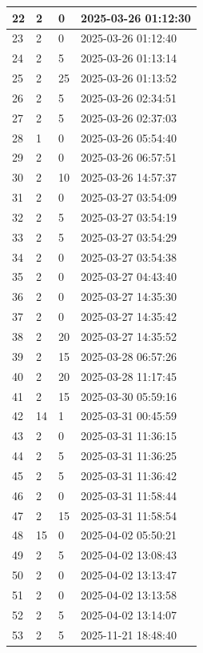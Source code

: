 \begin{longtable}{|l|l|l|l|}
22 & 2 & 0 & 2025-03-26 01:12:30 \\ \hline 
23 & 2 & 0 & 2025-03-26 01:12:40 \\ \hline 
24 & 2 & 5 & 2025-03-26 01:13:14 \\ \hline 
25 & 2 & 25 & 2025-03-26 01:13:52 \\ \hline 
26 & 2 & 5 & 2025-03-26 02:34:51 \\ \hline 
27 & 2 & 5 & 2025-03-26 02:37:03 \\ \hline 
28 & 1 & 0 & 2025-03-26 05:54:40 \\ \hline 
29 & 2 & 0 & 2025-03-26 06:57:51 \\ \hline 
30 & 2 & 10 & 2025-03-26 14:57:37 \\ \hline 
31 & 2 & 0 & 2025-03-27 03:54:09 \\ \hline 
32 & 2 & 5 & 2025-03-27 03:54:19 \\ \hline 
33 & 2 & 5 & 2025-03-27 03:54:29 \\ \hline 
34 & 2 & 0 & 2025-03-27 03:54:38 \\ \hline 
35 & 2 & 0 & 2025-03-27 04:43:40 \\ \hline 
36 & 2 & 0 & 2025-03-27 14:35:30 \\ \hline 
37 & 2 & 0 & 2025-03-27 14:35:42 \\ \hline 
38 & 2 & 20 & 2025-03-27 14:35:52 \\ \hline 
39 & 2 & 15 & 2025-03-28 06:57:26 \\ \hline 
40 & 2 & 20 & 2025-03-28 11:17:45 \\ \hline 
41 & 2 & 15 & 2025-03-30 05:59:16 \\ \hline 
42 & 14 & 1 & 2025-03-31 00:45:59 \\ \hline 
43 & 2 & 0 & 2025-03-31 11:36:15 \\ \hline 
44 & 2 & 5 & 2025-03-31 11:36:25 \\ \hline 
45 & 2 & 5 & 2025-03-31 11:36:42 \\ \hline 
46 & 2 & 0 & 2025-03-31 11:58:44 \\ \hline 
47 & 2 & 15 & 2025-03-31 11:58:54 \\ \hline 
48 & 15 & 0 & 2025-04-02 05:50:21 \\ \hline 
49 & 2 & 5 & 2025-04-02 13:08:43 \\ \hline 
50 & 2 & 0 & 2025-04-02 13:13:47 \\ \hline 
51 & 2 & 0 & 2025-04-02 13:13:58 \\ \hline 
52 & 2 & 5 & 2025-04-02 13:14:07 \\ \hline 
53 & 2 & 5 & 2025-11-21 18:48:40 \\ \hline 
 \end{longtable}

